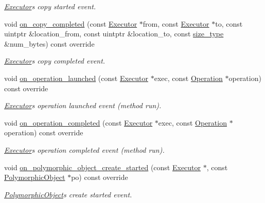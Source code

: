 \begin{DoxyCompactItemize}
\begin{DoxyCompactList}\small\item\em \hyperlink{classgko_1_1Executor}{Executor}\textquotesingle{}s copy started event. \end{DoxyCompactList}\item 
void \hyperlink{classgko_1_1log_1_1Stream_a66372936ad843609a057f9135c92bf3d}{on\+\_\+copy\+\_\+completed} (const \hyperlink{classgko_1_1Executor}{Executor} $\ast$from, const \hyperlink{classgko_1_1Executor}{Executor} $\ast$to, const uintptr \&location\+\_\+from, const uintptr \&location\+\_\+to, const \hyperlink{namespacegko_a6e5c95df0ae4e47aab2f604a22d98ee7}{size\+\_\+type} \&num\+\_\+bytes) const override
\begin{DoxyCompactList}\small\item\em \hyperlink{classgko_1_1Executor}{Executor}\textquotesingle{}s copy completed event. \end{DoxyCompactList}\item 
void \hyperlink{classgko_1_1log_1_1Stream_a0c9edcd1ec0e4483ace5effdefa7e1f5}{on\+\_\+operation\+\_\+launched} (const \hyperlink{classgko_1_1Executor}{Executor} $\ast$exec, const \hyperlink{classgko_1_1Operation}{Operation} $\ast$operation) const override
\begin{DoxyCompactList}\small\item\em \hyperlink{classgko_1_1Executor}{Executor}\textquotesingle{}s operation launched event (method run). \end{DoxyCompactList}\item 
void \hyperlink{classgko_1_1log_1_1Stream_a63029c1558fa8c8c5d3a5489e31afa66}{on\+\_\+operation\+\_\+completed} (const \hyperlink{classgko_1_1Executor}{Executor} $\ast$exec, const \hyperlink{classgko_1_1Operation}{Operation} $\ast$operation) const override
\begin{DoxyCompactList}\small\item\em \hyperlink{classgko_1_1Executor}{Executor}\textquotesingle{}s operation completed event (method run). \end{DoxyCompactList}\item 
void \hyperlink{classgko_1_1log_1_1Stream_a9109fbe3d2f3f186a15e2f8cbeaab3ca}{on\+\_\+polymorphic\+\_\+object\+\_\+create\+\_\+started} (const \hyperlink{classgko_1_1Executor}{Executor} $\ast$, const \hyperlink{classgko_1_1PolymorphicObject}{Polymorphic\+Object} $\ast$po) const override
\begin{DoxyCompactList}\small\item\em \hyperlink{classgko_1_1PolymorphicObject}{Polymorphic\+Object}\textquotesingle{}s create started event. \end{DoxyCompactList}\item 

\end{DoxyCompactItemize}
